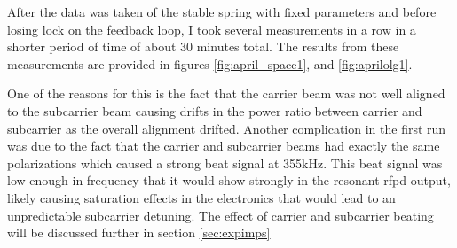
After the data was taken of the stable spring with fixed parameters and before
losing lock on the feedback loop, I took several measurements in a row in a
shorter period of time of about 30 minutes total. The results from these
measurements are provided in figures \ref{fig:april_space1}, and
\ref{fig:aprilolg1}.

One of the reasons for this is the fact that the carrier beam was not
well aligned to the subcarrier beam causing drifts in the power ratio between
carrier and subcarrier as the overall alignment drifted.
Another complication in the first run was due to the fact that the carrier and
subcarrier beams had exactly the same polarizations which caused a strong
beat signal at 355kHz. This beat signal was low enough in frequency that
it would show strongly in the resonant \ac{rfpd} output, likely causing
saturation effects in the electronics that would lead to an unpredictable
subcarrier detuning.
The effect of carrier and subcarrier beating will be discussed further in
section \ref{sec:expimps}

